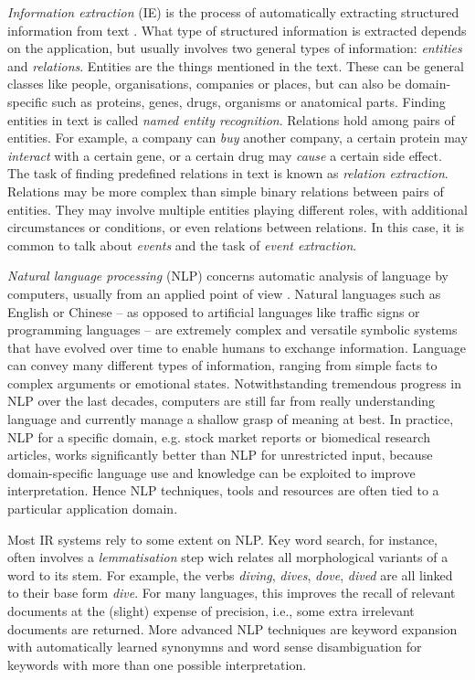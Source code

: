 \emph{Information extraction} (IE) is the process of automatically extracting structured information from text \citep{Jiang2012Information}.
What type of structured information is extracted depends on the application, but usually involves two general types of information: \emph{entities} and \emph{relations}.
Entities are the things mentioned in the text.
These can be general classes like people, organisations, companies or places, but can also be domain-specific such as proteins, genes, drugs, organisms or anatomical parts.
Finding entities in text is called \emph{named entity recognition}.
Relations hold among pairs of entities.
For example, a company can \emph{buy} another company, a certain protein may \emph{interact} with a certain gene, or a certain drug may \emph{cause} a certain side effect.
The task of finding predefined relations in text is known as \emph{relation extraction}.  
Relations may be more complex than simple binary relations between pairs of entities.
They may involve multiple entities playing different roles, with additional circumstances or conditions, or even relations between relations.
In this case, it is common to talk about \emph{events} and the task of \emph{event extraction}.

\emph{Natural language processing} (NLP) concerns automatic analysis of language by computers, usually from an applied point of view  \citep{jurafsky2000speech,manning1999foundations}.
Natural languages such as English or Chinese -- as opposed to artificial languages like traffic signs or programming languages -- are extremely complex and versatile symbolic systems that have evolved over time to enable humans to exchange information.
Language can convey many different types of information, ranging from simple facts to complex arguments or emotional states.
Notwithstanding tremendous progress in NLP over the last decades, computers are still far from really understanding language and currently manage a shallow grasp of meaning at best.
In practice, NLP for a specific domain, e.g. stock market reports or biomedical research articles, works significantly better than NLP for unrestricted input, because domain-specific language use and knowledge can be exploited to improve interpretation. 
Hence NLP techniques, tools and resources are often tied to a particular application domain.

Most IR systems rely to some extent on NLP.
Key word search, for instance, often involves a \emph{lemmatisation} step wich relates all morphological variants of a word to its stem.
For example, the verbs \emph{diving}, \emph{dives}, \emph{dove}, \emph{dived} are all linked to their base form \emph{dive}.
For many languages, this improves the recall of relevant documents at the (slight) expense of precision, i.e., some extra irrelevant documents are returned.
More advanced NLP techniques are keyword expansion with automatically learned synonymns and word sense disambiguation for keywords with more than one possible interpretation.  


